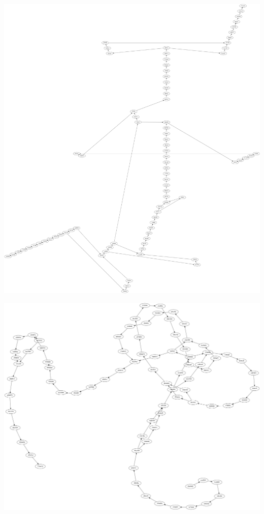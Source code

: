 \documentclass[cjk,dvipdfmx,20pt]{beamer}
\begin{document}
\begin{frame}{}
\begin{center}
\end{center}
\end{frame}

\begin{frame}{}
\begin{center}
\includegraphics[width=0.8\hsize]{image200812/git-twopi.png}
\end{center}
\end{frame}

\begin{frame}{}
\begin{center}
\includegraphics[width=0.8\hsize]{image200812/git-fdp.png}
\end{center}
\end{frame}
\end{document}
